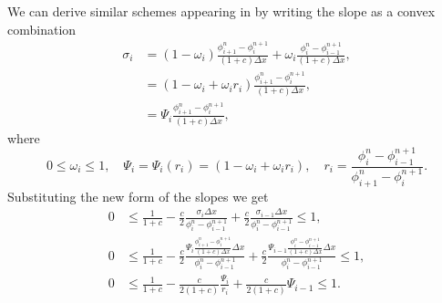 \documentclass[../thesis.tex]{subfiles}
\begin{document}
\begin{remark}
    We can derive similar schemes appearing in \cite{2023_Frolkovic} by writing the slope as a convex combination
    \begin{equation}
        \begin{split}
            \sigma_{i} &=
            (1-\omega_{i})
            \frac{\phi_{i+1}^{n}-\phi_{i}^{n+1}}
            {(1+c)\Delta x}
            + \omega_{i}
            \frac{\phi_{i}^{n} - \phi_{i-1}^{n+1}}
            {(1+c)\Delta x},
            \\
            &=
            \left( 1 - \omega_{i} + \omega_{i}r_i \right)
            \frac{\phi_{i+1}^{n}-\phi_{i}^{n+1}}
            {(1+c)\Delta x},
            \\
            &=
            \Psi_{i}
            \frac{\phi_{i+1}^{n}-\phi_{i}^{n+1}}
            {(1+c)\Delta x},
        \end{split}
    \end{equation}
where
\begin{equation}
    0 \leq \omega_{i} \leq 1,\quad
    \Psi_{i} = \Psi_{i}(r_{i}) =
    \left( 1 - \omega_{i} + \omega_{i}r_{i} \right),
    \quad
    r_{i} = \frac{\phi_{i}^{n} - \phi_{i-1}^{n+1}}
    {\phi_{i+1}^{n}-\phi_{i}^{n+1}}.
\end{equation}
Substituting the new form of the slopes we get
\begin{equation}\label{eqn: Frolkovic - necessary condition}
    \begin{split}
        0
        &\leq
        \frac{1}{1+c}
        -\frac{c}{2}
        \frac{\sigma_{i}\Delta x}
        {\phi_{i}^{n} - \phi_{i-1}^{n+1}}
        +\frac{c}{2}
        \frac{\sigma_{i-1}\Delta x}
        {\phi_{i}^{n} - \phi_{i-1}^{n+1}}
        \leq
        1,
        \\
        0
        &\leq
        \frac{1}{1+c}
        -\frac{c}{2}
        \frac{
            \Psi_{i}
            \frac{\phi_{i+1}^{n}-\phi_{i}^{n+1}}
            {(1+c)\Delta x}\Delta x}
            {\phi_{i}^{n} - \phi_{i-1}^{n+1}}
        +\frac{c}{2}
        \frac{
            \Psi_{i-1}
            \frac{\phi_{i}^{n}-\phi_{i-1}^{n+1}}
            {(1+c)\Delta x}\Delta x}
            {\phi_{i}^{n} - \phi_{i-1}^{n+1}}
        \leq
        1,
        \\
        0
        &\leq
        \frac{1}{1+c}
        -\frac{c}{2(1+c)}
        \frac{\Psi_{i}}{r_{i}}
        +\frac{c}{2(1+c)}
        \Psi_{i-1}
        \leq
        1.
    \end{split}

\end{equation}
\end{remark}
\end{document}
